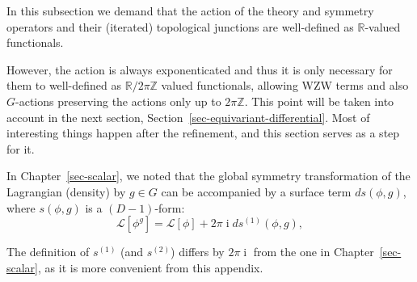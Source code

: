 \documentclass[
  letterpaper,
  DIV=11,
  numbers=noendperiod]{scrreport}
\DeclareMathOperator{\imunit}{i}
\newcounter{quartocalloutwrnno}
\newcommand{\quartocalloutwrn}[1]{\refstepcounter{quartocalloutwrnno}\label{#1}}
\begin{document}
\begin{tcolorbox}[enhanced jigsaw, opacityback=0, opacitybacktitle=0.6, leftrule=.75mm, arc=.35mm, coltitle=black, breakable, colframe=quarto-callout-warning-color-frame, titlerule=0mm, colback=white, bottomrule=.15mm, left=2mm, colbacktitle=quarto-callout-warning-color!10!white, toptitle=1mm, bottomtitle=1mm, title=\textcolor{quarto-callout-warning-color}{\faExclamationTriangle}\hspace{0.5em}{Warning \ref*{wrn-differential} }, rightrule=.15mm, toprule=.15mm]

\quartocalloutwrn{wrn-differential} 

In this subsection we demand that the action of the theory and symmetry
operators and their (iterated) topological junctions are well-defined as
\(\mathbb{R}\)-valued functionals.

However, the action is always exponenticated and thus it is only
necessary for them to well-defined as \(\mathbb{R}/2\pi \mathbb{Z}\)
valued functionals, allowing WZW terms and also \(G\)-actions preserving
the actions only up to \(2\pi \mathbb{Z}\). This point will be taken
into account in the next section,
Section~\ref{sec-equivariant-differential}. Most of interesting things
happen after the refinement, and this section serves as a step for it.

\end{tcolorbox}

In Chapter~\ref{sec-scalar}, we noted that the global symmetry
transformation of the Lagrangian (density) by \(g \in G\) can be
accompanied by a surface term \(ds(\phi,g)\), where \(s(\phi,g)\) is a
\((D-1)\)-form: \[
\mathcal{L}[\phi^g] = \mathcal{L}[\phi] + 2\pi\imunit ds^{(1)}(\phi,g),
\]

\begin{tcolorbox}[enhanced jigsaw, opacityback=0, opacitybacktitle=0.6, leftrule=.75mm, arc=.35mm, coltitle=black, breakable, colframe=quarto-callout-warning-color-frame, titlerule=0mm, colback=white, bottomrule=.15mm, left=2mm, colbacktitle=quarto-callout-warning-color!10!white, toptitle=1mm, bottomtitle=1mm, title=\textcolor{quarto-callout-warning-color}{\faExclamationTriangle}\hspace{0.5em}{Warning}, rightrule=.15mm, toprule=.15mm]

The definition of \(s^{(1)}\) (and \(s^{(2)}\)) differs by
\(2\pi\imunit\) from the one in Chapter~\ref{sec-scalar}, as it is more
convenient from this appendix.

\end{tcolorbox}
\end{document}
